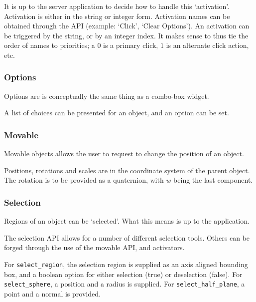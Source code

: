 \documentclass[11pt, oneside]{amsart}
\begin{document}
 It is up to the server application to decide how to handle this `activation'. Activation is either in the string or integer form. Activation names can be obtained through the API (example: `Click', `Clear Options'). An activation can be triggered by the string, or by an integer index. It makes sense to thus tie the order of names to priorities; a $0$ is a primary click, $1$ is an alternate click action, etc.

\subsubsection{Options}

Options are is conceptually the same thing as a combo-box widget.



 A list of choices can be presented for an object, and an option can be set.

\subsubsection{Movable}

Movable objects allows the user to request to change the position of an object.



Positions, rotations and scales are in the coordinate system of the parent object. The rotation is to be provided as a quaternion, with $w$ being the last component.

\subsubsection{Selection}

Regions of an object can be `selected'. What this means is up to the application.



The selection API allows for a number of different selection tools. Others can be forged through the use of the movable API, and activators.

For \texttt{select\_region}, the selection region is supplied as an axis aligned bounding box, and a boolean option for either selection (true) or deselection (false). For \texttt{select\_sphere}, a position and a radius is supplied. For \texttt{select\_half\_plane}, a point and a normal is provided.
\end{document}
